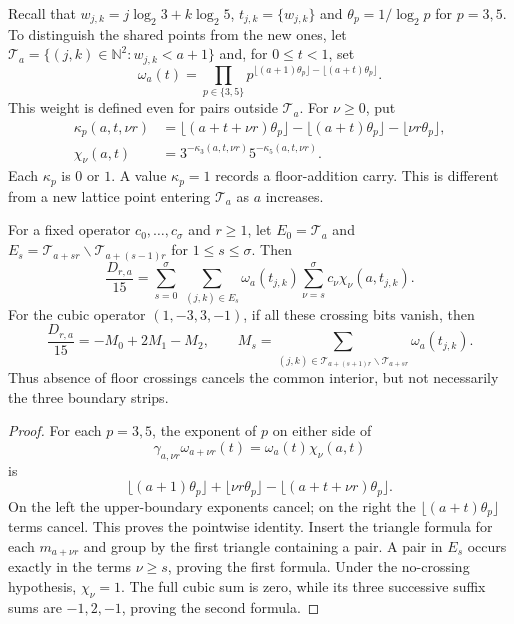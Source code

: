 \documentclass[11pt]{article}
\theoremstyle{remark}
\theoremstyle{plain}
\begin{document}
Recall that
$w_{j,k}=j\log_2 3+k\log_2 5$, $t_{j,k}=\{w_{j,k}\}$ and
$\theta_p=1/\log_2 p$ for $p=3,5$.
To distinguish the shared points from the new ones, let
$\mathcal T_a=\{(j,k)\in\mathbb N^2:w_{j,k}<a+1\}$ and, for $0\le t<1$, set
\[
 \omega_a(t)=\prod_{p\in\{3,5\}}
 p^{\lfloor(a+1)\theta_p\rfloor-\lfloor(a+t)\theta_p\rfloor}.
\]
This weight is defined even for pairs outside $\mathcal T_a$.  For $\nu\ge0$, put
\[
 \begin{split}
 \kappa_p(a,t,\nu r)
 &=\lfloor(a+t+\nu r)\theta_p\rfloor
   -\lfloor(a+t)\theta_p\rfloor-\lfloor\nu r\theta_p\rfloor,\\
 \chi_\nu(a,t)&=3^{-\kappa_3(a,t,\nu r)}5^{-\kappa_5(a,t,\nu r)}.
 \end{split}
\]
Each $\kappa_p$ is $0$ or $1$.  A value $\kappa_p=1$ records a floor-addition carry.  This is different
from a new lattice point entering $\mathcal T_a$ as $a$ increases.

\begin{proposition}
\label{long269:res:strip-decomposition}
For a fixed operator $c_0,\ldots,c_\sigma$ and $r\ge1$, let
$E_0=\mathcal T_a$ and $E_s=\mathcal T_{a+sr}\smallsetminus \mathcal T_{a+(s-1)r}$ for $1\le s\le\sigma$.
Then
\[
 \frac{D_{r,a}}{15}=
 \sum_{s=0}^{\sigma}\ \sum_{(j,k)\in E_s}
 \omega_a(t_{j,k})\sum_{\nu=s}^{\sigma}c_\nu\chi_\nu(a,t_{j,k}).
\]
For the cubic operator $(1,-3,3,-1)$, if all these crossing bits vanish,
then
\[
 \frac{D_{r,a}}{15}=-M_0+2M_1-M_2,\qquad
 M_s=\sum_{(j,k)\in \mathcal T_{a+(s+1)r}\smallsetminus \mathcal T_{a+sr}}\omega_a(t_{j,k}).
\]
Thus absence of floor crossings cancels the common interior, but not
necessarily the three boundary strips.
\end{proposition}
\begin{proof}
For each $p=3,5$, the exponent of $p$ on either side of
\[
 \gamma_{a,\nu r}\omega_{a+\nu r}(t)
   =\omega_a(t)\chi_\nu(a,t)
\]
is
\[
 \lfloor(a+1)\theta_p\rfloor+\lfloor\nu r\theta_p\rfloor
 -\lfloor(a+t+\nu r)\theta_p\rfloor.
\]
On the left the upper-boundary exponents cancel; on the right the
$\lfloor(a+t)\theta_p\rfloor$ terms cancel.  This proves the pointwise
identity.
Insert the triangle formula for each $m_{a+\nu r}$ and group by the first
triangle containing a pair.  A pair in $E_s$ occurs exactly in the terms
$\nu\ge s$, proving the first formula.  Under the no-crossing hypothesis,
$\chi_\nu=1$.  The full cubic sum is zero, while its three successive suffix
sums are $-1,2,-1$, proving the second formula.
\end{proof}
\end{document}
